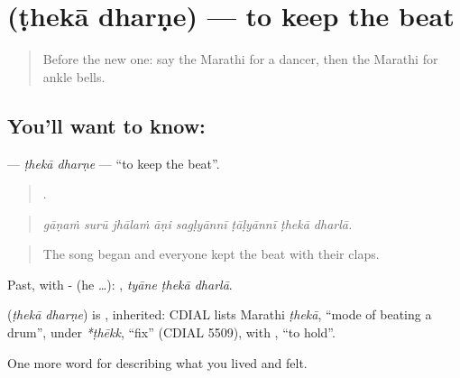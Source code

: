 \section[\texorpdfstring{\mr{ठेका} \mr{धरणे} (ṭhekā dharṇe)}{ठेका धरणे (ṭhekā dharṇe)}]{  (ṭhekā dharṇe) — to keep the beat}

\label{lesson:MR-C538-theka-dharne}



\begin{quote}
Before the new one: say the Marathi for a dancer, then the Marathi for ankle bells.
\end{quote}

\subsection*{You'll want to know:  }
\textbf{ } — \emph{ṭhekā dharṇe} — \textquotedblleft{}to keep the beat\textquotedblright{}.

\begin{quote}
       .
\end{quote}

\begin{quote}
\emph{gāṇaṁ surū jhālaṁ āṇi sagḷyānnī ṭāḷyānnī ṭhekā dharlā.}
\end{quote}

\begin{quote}
The song began and everyone kept the beat with their claps.
\end{quote}

Past, with - (he …):   , \emph{tyāne ṭhekā dharlā}.

\begin{cousinweb}
\textbf{ } (\emph{ṭhekā dharṇe}) is , inherited: CDIAL lists Marathi \emph{ṭhekā}, \textquotedblleft{}mode of beating a drum\textquotedblright{}, under \emph{*ṭhēkk}, \textquotedblleft{}fix\textquotedblright{} (CDIAL 5509), with , \textquotedblleft{}to hold\textquotedblright{}.
\end{cousinweb}

\begin{grammarlens}[title={What you've built}]
One more word for describing what you lived and felt.
\end{grammarlens}

